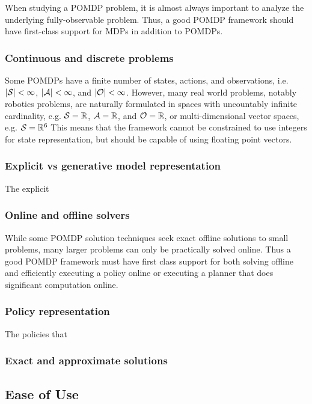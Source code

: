 When studying a POMDP problem, it is almost always important to analyze the underlying fully-observable problem.
Thus, a good POMDP framework should have first-class support for MDPs in addition to POMDPs.

\subsubsection{Continuous and discrete problems}

Some POMDPs have a finite number of states, actions, and observations, i.e. $|\mathcal{S}| < \infty$, $|\mathcal{A}| < \infty$, and $|\mathcal{O}| < \infty$.
However, many real world problems, notably robotics problems, are naturally formulated in spaces with uncountably infinite cardinality, e.g. $\mathcal{S} = \mathbb{R}$, $\mathcal{A} = \mathbb{R}$, and $\mathcal{O} = \mathbb{R}$, or multi-dimensional vector spaces, e.g. $\mathcal{S} = \mathbb{R}^6$
This means that the framework cannot be constrained to use integers for state representation, but should be capable of using floating point vectors.

\subsubsection{Explicit vs generative model representation}

The explicit

\subsubsection{Online and offline solvers}

While some POMDP solution techniques seek exact offline solutions to small problems, many larger problems can only be practically solved online.
Thus a good POMDP framework must have first class support for both solving offline and efficiently executing a policy online or executing a planner that does significant computation online.

\subsubsection{Policy representation}

The policies that 

\subsubsection{Exact and approximate solutions}

\subsection{Ease of Use}


